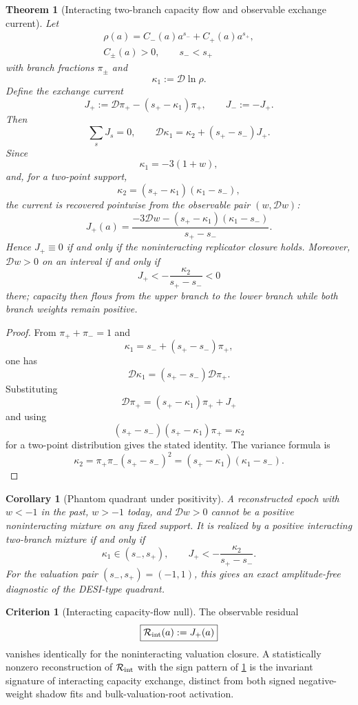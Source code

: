 \documentclass[aps,prd,reprint,nofootinbib,superscriptaddress,floatfix]{revtex4-2}
\numberwithin{equation}{section}
\theoremstyle{definition}
\newtheorem{criterion}{Criterion}[section]
\theoremstyle{plain}
\newtheorem{theorem}{Theorem}[section]
\newtheorem{corollary}{Corollary}[section]
\newcommand{\Dil}{\mathscr D}
\begin{document}
\begin{theorem}[Interacting two-branch capacity flow and observable exchange current]
\label{thm:interacting-current}
Let
\[
\begin{gathered}
\rho(a)=C_-(a)a^{s_-}+C_+(a)a^{s_+},\\
C_\pm(a)>0,\qquad s_-<s_+
\end{gathered}
\]
with branch fractions \(\pi_\pm\) and
\[
\kappa_1:=\Dil\ln\rho .
\]
Define the exchange current
\[
J_+:=\Dil\pi_+-(s_+-\kappa_1)\pi_+,
\qquad
J_-:=-J_+ .
\]
Then
\[
\sum_sJ_s=0,
\qquad
\Dil\kappa_1=\kappa_2+(s_+-s_-)J_+ .
\]
Since
\[
\kappa_1=-3(1+w),
\]
and, for a two-point support,
\[
\kappa_2=(s_+-\kappa_1)(\kappa_1-s_-),
\]
the current is recovered pointwise from the observable pair \((w,\Dil w)\):
\begin{equation}
\boxed{
J_+(a)=
\frac{
-3\Dil w-(s_+-\kappa_1)(\kappa_1-s_-)
}{
s_+-s_-
}.
}
\label{eq:observable-current}
\end{equation}
Hence \(J_+\equiv0\) if and only if the noninteracting replicator closure holds.  Moreover, \(\Dil w>0\) on an interval if and only if
\[
J_+<-\frac{\kappa_2}{s_+-s_-}<0
\]
there; capacity then flows from the upper branch to the lower branch while both branch weights remain positive.
\end{theorem}

\begin{proof}
From \(\pi_++\pi_-=1\) and
\[
\kappa_1=s_-+(s_+-s_-)\pi_+,
\]
one has
\[
\Dil\kappa_1=(s_+-s_-)\Dil\pi_+ .
\]
Substituting
\[
\Dil\pi_+=(s_+-\kappa_1)\pi_++J_+
\]
and using
\[
(s_+-s_-)(s_+-\kappa_1)\pi_+=\kappa_2
\]
for a two-point distribution gives the stated identity.  The variance formula is
\[
\kappa_2=\pi_+\pi_-(s_+-s_-)^2
=(s_+-\kappa_1)(\kappa_1-s_-).
\]
\end{proof}

\begin{corollary}[Phantom quadrant under positivity]
A reconstructed epoch with \(w<-1\) in the past, \(w>-1\) today, and \(\Dil w>0\) cannot be a positive noninteracting mixture on any fixed support.  It is realized by a positive interacting two-branch mixture if and only if
\[
\kappa_1\in(s_-,s_+),
\qquad
J_+<-\frac{\kappa_2}{s_+-s_-}.
\]
For the valuation pair \((s_-,s_+)=(-1,1)\), this gives an exact amplitude-free diagnostic of the DESI-type quadrant.
\end{corollary}

\begin{criterion}[Interacting capacity-flow null]
The observable residual
\[
\boxed{\mathcal R_{\rm int}(a):=J_+(a)}
\]
vanishes identically for the noninteracting valuation closure.  A statistically nonzero reconstruction of \(\mathcal R_{\rm int}\) with the sign pattern of \cref{thm:interacting-current} is the invariant signature of interacting capacity exchange, distinct from both signed negative-weight shadow fits and bulk-valuation-root activation.
\end{criterion}
\end{document}
